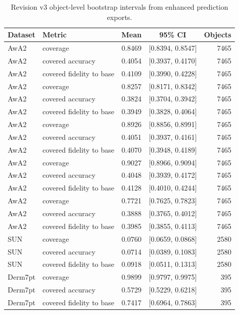 \begin{table}[H]
\caption{Revision v3 object-level bootstrap intervals from enhanced prediction exports.\label{tab:v3_object_intervals}}
\centering
\small
\begin{tabular}{llccr}
\toprule
Dataset & Metric & Mean & 95\% CI & Objects \\
\midrule
AwA2 & coverage & 0.8469 & [0.8394, 0.8547] & 7465 \\
AwA2 & covered accuracy & 0.4054 & [0.3937, 0.4170] & 7465 \\
AwA2 & covered fidelity to base & 0.4109 & [0.3990, 0.4228] & 7465 \\
AwA2 & coverage & 0.8257 & [0.8171, 0.8342] & 7465 \\
AwA2 & covered accuracy & 0.3824 & [0.3704, 0.3942] & 7465 \\
AwA2 & covered fidelity to base & 0.3949 & [0.3828, 0.4064] & 7465 \\
AwA2 & coverage & 0.8926 & [0.8856, 0.8991] & 7465 \\
AwA2 & covered accuracy & 0.4051 & [0.3937, 0.4161] & 7465 \\
AwA2 & covered fidelity to base & 0.4070 & [0.3948, 0.4189] & 7465 \\
AwA2 & coverage & 0.9027 & [0.8966, 0.9094] & 7465 \\
AwA2 & covered accuracy & 0.4048 & [0.3939, 0.4172] & 7465 \\
AwA2 & covered fidelity to base & 0.4128 & [0.4010, 0.4244] & 7465 \\
AwA2 & coverage & 0.7721 & [0.7625, 0.7823] & 7465 \\
AwA2 & covered accuracy & 0.3888 & [0.3765, 0.4012] & 7465 \\
AwA2 & covered fidelity to base & 0.3985 & [0.3855, 0.4113] & 7465 \\
SUN & coverage & 0.0760 & [0.0659, 0.0868] & 2580 \\
SUN & covered accuracy & 0.0714 & [0.0389, 0.1083] & 2580 \\
SUN & covered fidelity to base & 0.0918 & [0.0511, 0.1313] & 2580 \\
Derm7pt & coverage & 0.9899 & [0.9797, 0.9975] & 395 \\
Derm7pt & covered accuracy & 0.5729 & [0.5229, 0.6218] & 395 \\
Derm7pt & covered fidelity to base & 0.7417 & [0.6964, 0.7863] & 395 \\
\bottomrule
\end{tabular}
\end{table}
